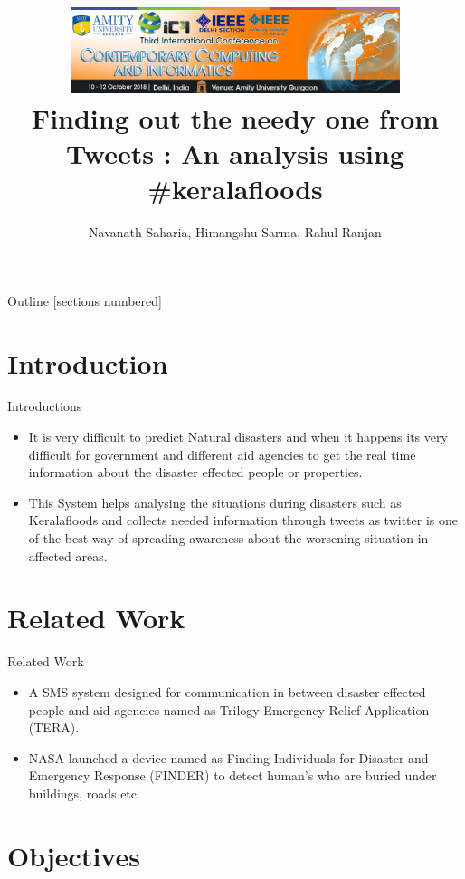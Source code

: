 \documentclass[10pt]{beamer}
\title{\includegraphics[width=10.5cm,height=2.5cm]{iC3I_Banner}\\
Finding out the needy one from Tweets : An
analysis using \#keralafloods}
\date{}
\author{ Navanath Saharia, Himangshu Sarma, Rahul Ranjan}
\institute{\textbf{Indian Institute of Information Technology Senapati (Manipur)}}
\begin{document}
\maketitle



\begin{frame}{Outline}
  [sections numbered]
  \tableofcontents[hideallsubsections]
\end{frame}

\section{Introduction}

\begin{frame}[fragile]{Introductions}
\begin{itemize}
    \item It is very difficult to predict Natural disasters and
when it happens its very difficult for government and different
aid agencies to get the real time information about the disaster
effected people or properties.
    \item This System helps analysing the situations during disasters such as Keralafloods and
collects needed information through tweets as twitter is one of the
best way of spreading awareness about the worsening situation
in affected areas.
\end{itemize}

  
\end{frame}


\section{Related Work}

\begin{frame}[fragile]{Related Work}
\begin{itemize}
    \item A SMS system designed
for communication in between disaster effected people and
aid agencies named as Trilogy Emergency Relief Application
(TERA).
\item NASA launched a device
named as Finding Individuals for Disaster and Emergency
Response (FINDER) to detect human’s who are buried under
buildings, roads etc.
\end{itemize}

  
\end{frame}

\section{Objectives}
\end{document}
